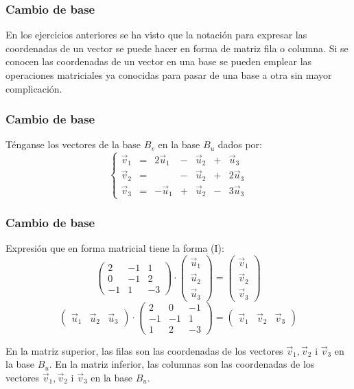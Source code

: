 \documentclass{beamer}
\begin{document}
   \begin{frame}
  \frametitle{Cambio de base}
En los ejercicios anteriores se ha visto que la notaci\'on para expresar las coordenadas de un vector se puede hacer en forma de matriz fila o columna. Si se conocen las coordenadas de un vector en una base se pueden emplear las operaciones matriciales ya conocidas para pasar de una base a otra sin mayor complicaci\'on.
\end{frame}

   \begin{frame}
  \frametitle{Cambio de base}
  T\'enganse los vectores de la base $B_v$ en la base $B_u$ dados por:
\[\left\{\begin{array}{ccccccc}\vec v_1 & = & 2\vec u_1 & - & \vec u_2 & + & \vec u_3 \\\vec v_2 & = &  & - & \vec u_2 & + & 2\vec u_3 \\\vec v_3 & = & -\vec u_1 & + & \vec u_2 & - & 3\vec u_3\end{array}\right.\]
\end{frame}

   \begin{frame}
  \frametitle{Cambio de base}
Expresi\'on que en forma matricial tiene la forma (I):
\[\left(\begin{array}{ccc}2 & -1 & 1 \\0 & -1 & 2 \\-1 & 1 & -3\end{array}\right) \cdot \left(\begin{array}{c}\vec u_1 \\ \vec u_2\\ \vec u_3\end{array}\right) = \left(\begin{array}{c}\vec v_1 \\ \vec v_2\\ \vec v_3\end{array}\right) \]
\[ \left(\begin{array}{ccc}\vec u_1 & \vec u_2 & \vec u_3\end{array}\right)\cdot \left(\begin{array}{ccc}2 & 0 & -1 \\-1 & -1 & 1 \\1 & 2 & -3\end{array}\right) = \left(\begin{array}{ccc}\vec v_1 & \vec v_2 & \vec v_3\end{array}\right)
\]

En la matriz superior, las filas son las coordenadas de los vectores $\vec v_1,\vec v_2$ i $\vec v_3$ en la base $B_u$.
En la matriz inferior, las columnas son las coordenadas de los vectores $\vec v_1,\vec v_2$ i $\vec v_3$ en la base $B_u$.
\end{frame}
\end{document}
